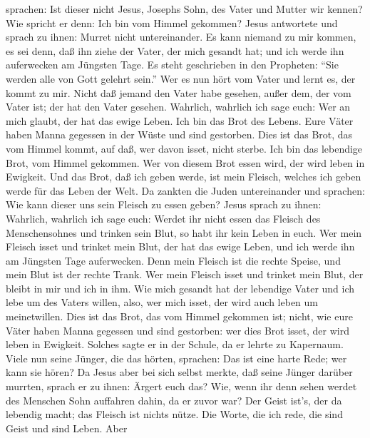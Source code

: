 sprachen: Ist dieser nicht Jesus, Josephs Sohn, des Vater und Mutter wir
kennen? Wie spricht er denn: Ich bin vom Himmel gekommen? 
Jesus antwortete und sprach zu ihnen: Murret nicht untereinander.
 Es kann niemand zu mir kommen, es sei denn, daß ihn ziehe
der Vater, der mich gesandt hat; und ich werde ihn auferwecken am
Jüngsten Tage.  Es steht geschrieben in den Propheten:
``Sie werden alle von Gott gelehrt sein.'' Wer es nun hört vom Vater und
lernt es, der kommt zu mir.  Nicht daß jemand den Vater
habe gesehen, außer dem, der vom Vater ist; der hat den Vater gesehen.
 Wahrlich, wahrlich ich sage euch: Wer an mich glaubt, der
hat das ewige Leben.  Ich bin das Brot des Lebens.
 Eure Väter haben Manna gegessen in der Wüste und sind
gestorben.  Dies ist das Brot, das vom Himmel kommt, auf
daß, wer davon isset, nicht sterbe.  Ich bin das lebendige
Brot, vom Himmel gekommen. Wer von diesem Brot essen wird, der wird
leben in Ewigkeit. Und das Brot, daß ich geben werde, ist mein Fleisch,
welches ich geben werde für das Leben der Welt.  Da zankten
die Juden untereinander und sprachen: Wie kann dieser uns sein Fleisch
zu essen geben?  Jesus sprach zu ihnen: Wahrlich, wahrlich
ich sage euch: Werdet ihr nicht essen das Fleisch des Menschensohnes und
trinken sein Blut, so habt ihr kein Leben in euch.  Wer
mein Fleisch isset und trinket mein Blut, der hat das ewige Leben, und
ich werde ihn am Jüngsten Tage auferwecken.  Denn mein
Fleisch ist die rechte Speise, und mein Blut ist der rechte Trank.
 Wer mein Fleisch isset und trinket mein Blut, der bleibt
in mir und ich in ihm.  Wie mich gesandt hat der lebendige
Vater und ich lebe um des Vaters willen, also, wer mich isset, der wird
auch leben um meinetwillen.  Dies ist das Brot, das vom
Himmel gekommen ist; nicht, wie eure Väter haben Manna gegessen und sind
gestorben: wer dies Brot isset, der wird leben in Ewigkeit.
 Solches sagte er in der Schule, da er lehrte zu Kapernaum.
 Viele nun seine Jünger, die das hörten, sprachen: Das ist
eine harte Rede; wer kann sie hören?  Da Jesus aber bei
sich selbst merkte, daß seine Jünger darüber murrten, sprach er zu
ihnen: Ärgert euch das?  Wie, wenn ihr denn sehen werdet
des Menschen Sohn auffahren dahin, da er zuvor war?  Der
Geist ist's, der da lebendig macht; das Fleisch ist nichts nütze. Die
Worte, die ich rede, die sind Geist und sind Leben.  Aber
